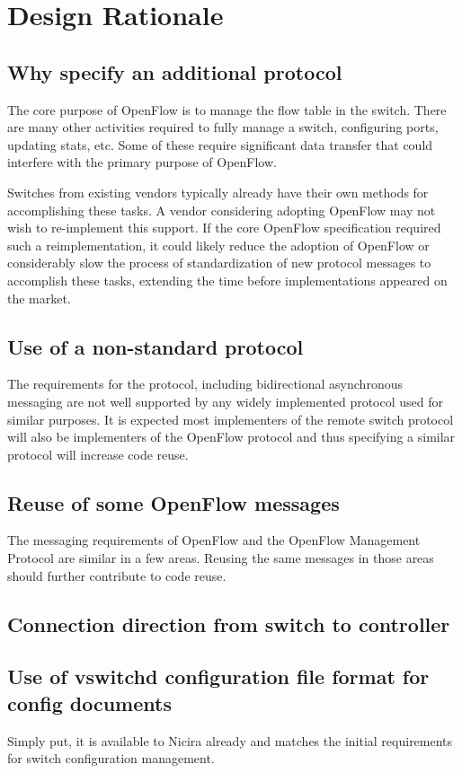 \documentclass[11pt,a4paper]{article}
\begin{document}
\section{Design Rationale}
\label{sec-3}


\subsection{Why specify an additional protocol}
\label{sec-3.1}


   The core purpose of OpenFlow is to manage the flow table in the
   switch.  There are many other activities required to fully manage a
   switch, configuring ports, updating stats, etc.  Some of these
   require significant data transfer that could interfere with the
   primary purpose of OpenFlow.

   Switches from existing vendors typically already have their own
   methods for accomplishing these tasks.  A vendor considering
   adopting OpenFlow may not wish to re-implement this support.  If
   the core OpenFlow specification required such a reimplementation,
   it could likely reduce the adoption of OpenFlow or considerably
   slow the process of standardization of new protocol messages to
   accomplish these tasks, extending the time before implementations
   appeared on the market.

\subsection{Use of a non-standard protocol}
\label{sec-3.2}


   The requirements for the protocol, including bidirectional
   asynchronous messaging are not well supported by any widely
   implemented protocol used for similar purposes.  It is expected
   most implementers of the remote switch protocol will also be
   implementers of the OpenFlow protocol and thus specifying a similar
   protocol will increase code reuse.

\subsection{Reuse of some OpenFlow messages}
\label{sec-3.3}


   The messaging requirements of OpenFlow and the OpenFlow Management 
   Protocol are similar in a few areas.  Reusing the same messages in
   those areas should further contribute to code reuse.

\subsection{Connection direction from switch to controller}
\label{sec-3.4}


\subsection{Use of vswitchd configuration file format for config documents}
\label{sec-3.5}


   Simply put, it is available to Nicira already and matches the
   initial requirements for switch configuration management.
\end{document}
